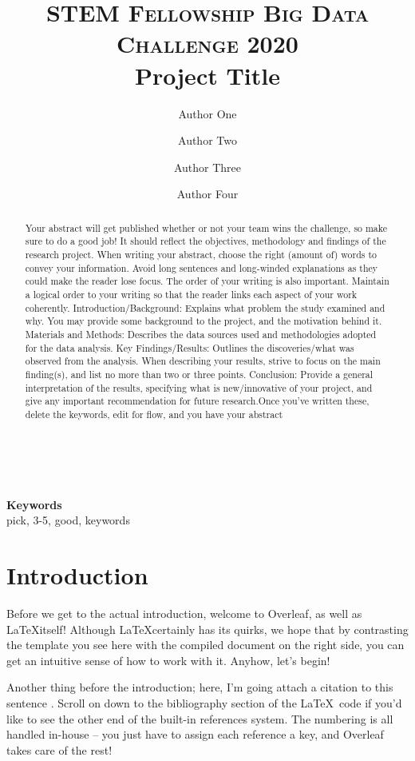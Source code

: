 \documentclass[10pt,twocolumn,letterpaper]{article}
\title{
		\usefont{OT1}{bch}{b}{n}
		\normalfont \normalsize \textsc{STEM Fellowship Big Data Challenge 2020} \\ [10pt]
		\huge Project Title \\
}
\author[1]{Author One}
\author[1]{Author Two}
\author[1]{Author Three}
\author[2]{Author Four}
\affil[1]{One University}
\affil[2]{B University}
\begin{document}
\maketitle

\begin{abstract}
Your abstract will get published whether or not your team wins the challenge, so make sure to do a good job! It should reflect the objectives, methodology and findings of the research project. When writing your abstract, choose the right (amount of) words to convey your information. Avoid long sentences and long-winded explanations as they could make the reader lose focus. The order of your writing is also important. Maintain a logical order to your writing so that the reader links each aspect of your work coherently. Introduction/Background: Explains what problem the study examined and why. You may provide some background to the project, and the motivation behind it. Materials and Methods: Describes the data sources used and methodologies adopted for the data analysis. Key Findings/Results: Outlines the discoveries/what was observed from the analysis. When describing your results, strive to focus on the main finding(s), and list no more than two or three points. Conclusion: Provide a general interpretation of the results, specifying what is new/innovative of your project, and give any important recommendation for future research.Once you've written these, delete the keywords, edit for flow, and you have your abstract
\end{abstract} \\ 
\\ 
{\textbf{Keywords} \\
pick, 3-5, good, keywords}

\section{Introduction}
Before we get to the actual introduction, welcome to Overleaf, as well as \LaTeX itself! Although \LaTeX certainly has its quirks, we hope that by contrasting the template you see here with the compiled document on the right side, you can get an intuitive sense of how to work with it. Anyhow, let's begin!

Another thing before the introduction; here, I'm going attach a citation to this sentence \cite{ReferenceName}. Scroll on down to the bibliography section of the \LaTeX\ code if you'd like to see the other end of the built-in references system. The numbering is all handled in-house -- you just have to assign each reference a key, and Overleaf takes care of the rest!
\end{document}

